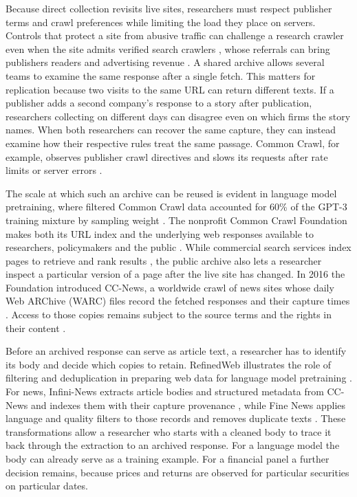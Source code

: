 Because direct collection revisits live sites, researchers must respect
publisher terms and crawl preferences while limiting the load they place
on servers. Controls that protect a site from abusive traffic can
challenge a research crawler even when the site admits verified search
crawlers \citep{cloudflare2026}, whose referrals can bring publishers
readers and advertising revenue \citep{cma2020publishers}. A shared
archive allows several teams to examine the same response after a single
fetch. This matters for replication because two visits to the same URL
can return different texts. If a publisher adds a second company's
response to a story after publication, researchers collecting on
different days can disagree even on which firms the story names. When
both researchers can recover the same capture, they can instead examine
how their respective rules treat the same passage. Common Crawl, for
example, observes publisher crawl directives
and slows its requests after rate limits or server errors
\citep{commoncrawlfaq}.

The scale at which such an archive can be reused is evident in language
model pretraining, where filtered Common Crawl data accounted for 60\%
of the GPT-3 training mixture by sampling weight
\citep[Table~2.2]{brown2020}. The nonprofit Common Crawl Foundation
makes both its URL index and the underlying web responses available to
researchers, policymakers and the public
\citep{commoncrawlabout,commoncrawloverview}. While commercial search
services index pages to retrieve and rank results \citep{google2026search},
the public archive also lets a researcher inspect a particular version
of a page after the live site has changed. In 2016 the Foundation
introduced CC-News, a worldwide crawl of news sites whose daily Web
ARChive (WARC) files record the fetched responses and their capture
times \citep{nagel2016}. Access to those copies remains subject to the
source terms and the rights in their content \citep{commoncrawlterms}.

Before an archived response can serve as article text, a researcher
has to identify its body and decide which copies to retain.
RefinedWeb illustrates the role of filtering and deduplication in
preparing web data for language model pretraining \citep{penedo2023}.
For news, Infini-News extracts article bodies and structured metadata
from CC-News and indexes them with their capture provenance
\citep{lazzaroni2026}, while Fine News applies language and quality
filters to those records and removes duplicate texts \citep{solovev2026}.
These transformations allow a researcher who starts with a cleaned
body to trace it back through the extraction to an archived response.
For a language model the body can already serve as a training example.
For a financial panel a further decision remains, because prices and
returns are observed for particular securities on particular dates.

